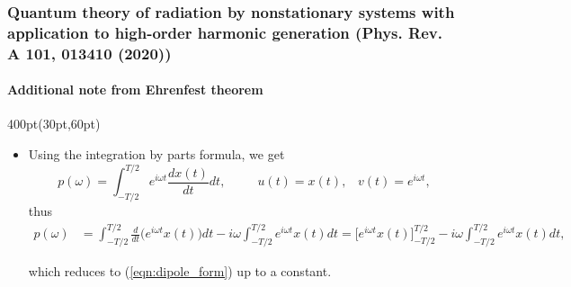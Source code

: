 \begin{frame}
\frametitle{Quantum theory of radiation by nonstationary systems 
	with application to high-order harmonic generation
        (Phys. Rev. A 101, 013410 (2020))}
	\framesubtitle{Additional note from Ehrenfest theorem}

\begin{textblock*}{400pt}(30pt,60pt)
\footnotesize
\begin{itemize}
\item  Using the integration by parts formula, we get
\begin{equation}
   p(\omega) = \int_{-T/2}^{T/2} e^{i\omega t} \frac{dx(t)}{dt}dt,\hspace{30pt}
   u(t) = x(t),\;\;\; v(t) = e^{i\omega t},
\end{equation}
\noindent thus
\begin{align}
   p(\omega) & = \int_{-T/2}^{T/2} \frac{d}{dt}\Big(e^{i\omega t}x(t)\Big)dt
    -i\omega \int_{-T/2}^{T/2} e^{i\omega t}x(t)dt
              = \Bigg[ e^{i\omega t} x(t)\Bigg]_{-T/2}^{T/2}
               -i\omega \int_{-T/2}^{T/2} e^{i\omega t}x(t)dt,
\label{eqn:additional}
\end{align}

		\noindent which reduces to (\ref{eqn:dipole_form})
		up to a constant. 




\end{itemize}
\end{textblock*}


\end{frame}


